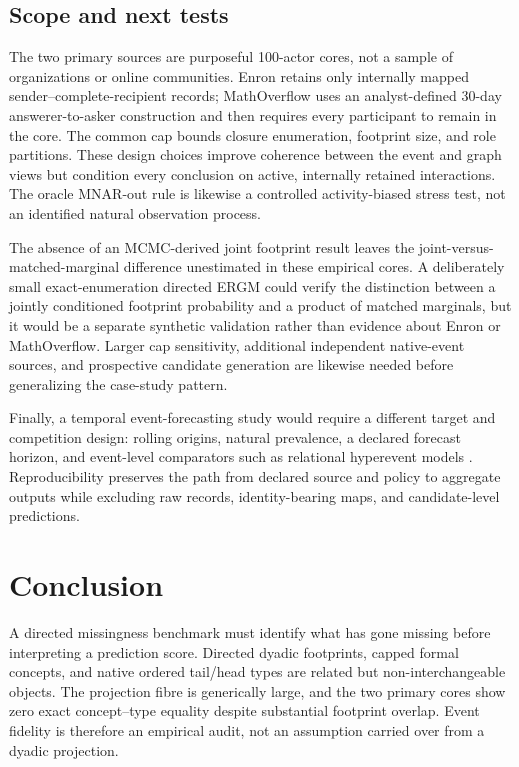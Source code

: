 \documentclass[10pt]{article}
\begin{document}
\subsection{Scope and next tests}
The two primary sources are purposeful 100-actor cores, not a sample of organizations or online communities. Enron retains only internally mapped sender--complete-recipient records; MathOverflow uses an analyst-defined 30-day answerer-to-asker construction and then requires every participant to remain in the core. The common cap bounds closure enumeration, footprint size, and role partitions. These design choices improve coherence between the event and graph views but condition every conclusion on active, internally retained interactions. The oracle MNAR-out rule is likewise a controlled activity-biased stress test, not an identified natural observation process.

The absence of an MCMC-derived joint footprint result leaves the joint-versus-matched-marginal difference unestimated in these empirical cores. A deliberately small exact-enumeration directed ERGM could verify the distinction between a jointly conditioned footprint probability and a product of matched marginals, but it would be a separate synthetic validation rather than evidence about Enron or MathOverflow. Larger cap sensitivity, additional independent native-event sources, and prospective candidate generation are likewise needed before generalizing the case-study pattern.

Finally, a temporal event-forecasting study would require a different target and competition design: rolling origins, natural prevalence, a declared forecast horizon, and event-level comparators such as relational hyperevent models \citep{lernerLomi2023}. Reproducibility preserves the path from declared source and policy to aggregate outputs while excluding raw records, identity-bearing maps, and candidate-level predictions.

\section{Conclusion}
A directed missingness benchmark must identify what has gone missing before interpreting a prediction score. Directed dyadic footprints, capped formal concepts, and native ordered tail/head types are related but non-interchangeable objects. The projection fibre is generically large, and the two primary cores show zero exact concept--type equality despite substantial footprint overlap. Event fidelity is therefore an empirical audit, not an assumption carried over from a dyadic projection.
\end{document}
